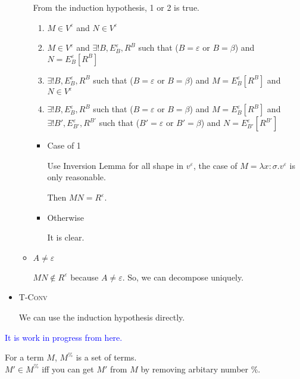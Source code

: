 \documentclass[9pt, a4paper]{extarticle}
\theoremstyle{break}
\newcommand{\TConv}{\textsc{T-Conv}}
\newcommand{\blue}[1]{\textcolor{blue}{ #1 }}
\begin{document}
\begin{itemize}
\begin{itemize}
		            From the induction hypothesis, 1 or 2 is true.

		            \begin{enumerate}
			            \item $ M \in V^\varepsilon$ and $ N \in V^\varepsilon$
			            \item $ M \in V^\varepsilon$ and $\exists ! B, E^\varepsilon_B, R^B$ such that ($B = \varepsilon$ or $B = \beta$) and $N = E^\varepsilon_B[R^B]$
			            \item $\exists ! B, E^\varepsilon_B, R^B$ such that ($B = \varepsilon$ or $B = \beta$) and $M = E^\varepsilon_B[R^B]$ and $ N \in V^\varepsilon$
			            \item $\exists ! B, E^\varepsilon_B, R^B$ such that ($B = \varepsilon$ or $B = \beta$) and $M = E^\varepsilon_B[R^B]$ and $\exists ! B', E^\varepsilon_{B'}, R^{B'}$ such that ($B' = \varepsilon$ or $B' = \beta$) and $N = E^\varepsilon_{B'}[R^{B'}]$
		            \end{enumerate}

		            \begin{itemize}
			            \item Case of 1

			                  Use Inversion Lemma for all shape in $v^\varepsilon$, the case of $ M = \lambda x:\sigma.v^\varepsilon$ is only reasonable.

			                  Then $M N = R^\varepsilon$.

			            \item Otherwise

			                  It is clear.
		            \end{itemize}

		      \item $ A \neq \varepsilon $

		            $M N \notin R^\varepsilon$ because $ A \neq \varepsilon$.
		            So, we can decompose uniquely.

	      \end{itemize}


	\item \TConv

	      We can use the induction hypothesis directly.

\end{itemize}

\blue{\huge{It is work in progress from here.}}

\begin{dfn}
	For a term $M$, $M^\%$ is a set of terms.\\
	$M' \in M^\%$ iff you can get $M'$ from $M$ by removing arbitary number $\%$.
\end{dfn}
\end{document}
